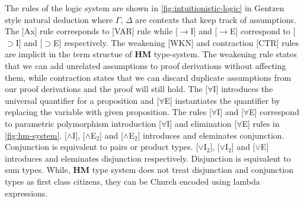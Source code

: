 The rules of the logic system are shown in \cref{fig:intuitionistic-logic} in Gentzen style natural deduction
where $\Gamma$, $\Delta$ are contexts that keep track of assumptions. The [Ax] rule corresponds to [VAR] rule while [$\rightarrow$I] and [$\rightarrow$E] correspond
to [$\supset$I] and [$\supset$E] respectively. The weakening [WKN] and contraction [CTR] rules are implicit in the term structue of \textbf{HM} type-system.
The weakening rule states that we can add unrelated assumptions to proof derivations without
affecting them, while contraction states that we can discard duplicate assumptions from our proof derivations and the proof will still hold.
The [$\forall$I] introduces the universal quantifier for a proposition and [$\forall$E] instantiates
the quantifier by replacing the variable with given proposition. The rules [$\forall$I] and [$\forall$E] correspond to parametric polymorphism
introduction [$\forall$I] and elimination [$\forall$E] rules in \cref{fig:hm-system}. [$\wedge$I], [$\wedge$E$_2$] and [$\wedge$E$_2$] introduces and eleminates
conjunction. Conjunction is equivalent to pairs or product types. [$\vee$I$_2$], [$\vee$I$_2$] and [$\vee$E] introduces and eleminates disjunction respectively.
Disjunction is equivalent to sum types. While, \textbf{HM} type system does not treat disjunction and conjunction types as first class citizens,
they can be Church encoded using lambda expressions\citep{pierce_tapl_2002}.

